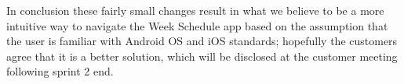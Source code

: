 \bigskip \noindent
In conclusion these fairly small changes result in what we believe to be a more intuitive way to navigate the Week Schedule app based on the assumption that the user is familiar with Android OS and iOS standards; hopefully the customers agree that it is a better solution, which will be disclosed at the customer meeting following sprint 2 end.
